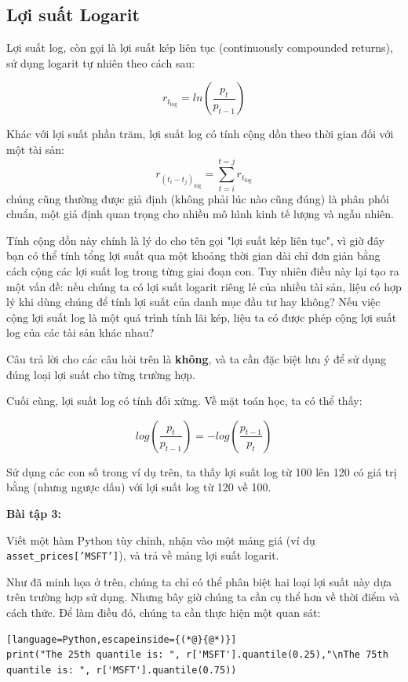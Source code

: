 \subsection{Lợi suất Logarit}

Lợi suất log, còn gọi là lợi suất kép liên tục (continuously compounded returns), sử dụng logarit tự nhiên theo cách sau:

$$
r_{t_\text{log}} = ln \left ( \frac{p_t}{p_{t-1}} \right )
$$

Khác với lợi suất phần trăm, lợi suất log có tính cộng dồn theo thời gian đối với một tài sản:
$$
r_{(t_{i}-t_{j})_{\text{log}}} = \sum_{t = i}^{t = j} r_{t_\text{log}}
$$
chúng cũng thường được giả định (không phải lúc nào cũng đúng) là phân phối chuẩn, một giả định quan trọng cho nhiều mô hình kinh tế lượng và ngẫu nhiên.

Tính cộng dồn này chính là lý do cho tên gọi "lợi suất kép liên tục", vì giờ đây bạn có thể tính tổng lợi suất qua một khoảng thời gian dài chỉ đơn giản bằng cách cộng các lợi suất log trong từng giai đoạn con. Tuy nhiên điều này lại tạo ra một vấn đề: nếu chúng ta có lợi suất logarit riêng lẻ của nhiều tài sản, liệu có hợp lý khi dùng chúng để tính lợi suất của danh mục đầu tư hay không? Nếu việc cộng lợi suất log là một quá trình tính lãi kép, liệu ta có được phép cộng lợi suất log của các tài sản khác nhau?

Câu trả lời cho các câu hỏi trên là \textbf{không}, và ta cần đặc biệt lưu ý để sử dụng đúng loại lợi suất cho từng trường hợp.

Cuối cùng, lợi suất log có tính đối xứng. Về mặt toán học, ta có thể thấy:

$$
log \left ( \frac{p_{t}}{p_{t-1}} \right ) = - log \left ( \frac{p_{t-1}}{p_{t}} \right )
$$

Sử dụng các con số trong ví dụ trên, ta thấy lợi suất log từ 100 lên 120 có giá trị bằng (nhưng ngược dấu) với lợi suất log từ 120 về 100.

\textbf{Bài tập 3:}

Viết một hàm Python tùy chỉnh, nhận vào một mảng giá (ví dụ \texttt{asset\_prices['MSFT']}), và trả về mảng lợi suất logarit.

Như đã minh họa ở trên, chúng ta chỉ có thể phân biệt hai loại lợi suất này dựa trên trường hợp sử dụng. Nhưng bây giờ chúng ta cần cụ thể hơn về thời điểm và cách thức. Để làm điều đó, chúng ta cần thực hiện một quan sát:

\begin{lstlisting}[language=Python,escapeinside={(*@}{@*)}]
print("The 25th quantile is: ", r['MSFT'].quantile(0.25),"\nThe 75th quantile is: ", r['MSFT'].quantile(0.75))
\end{lstlisting}


